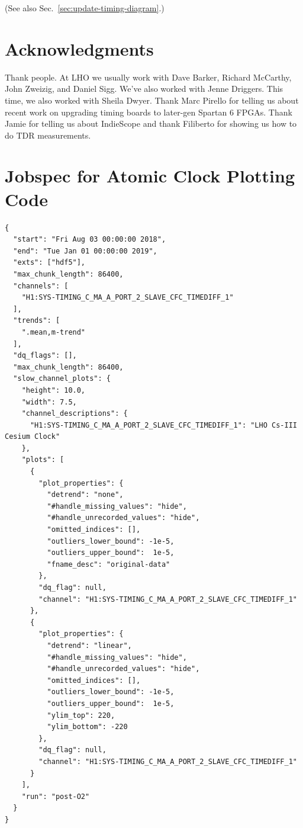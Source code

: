\documentclass{article}
\newcommand*{\TODO}{\textcolor{todo}}
\begin{document}
(See also Sec.~\ref{sec:update-timing-diagram}.)

\section{Acknowledgments}

\TODO{Thank people. At LHO we usually work with Dave Barker, Richard McCarthy, John Zweizig, and Daniel Sigg. We've also worked with Jenne Driggers. This time, we also worked with Sheila Dwyer. Thank Marc Pirello for telling us about recent work on upgrading timing boards to later-gen Spartan 6 FPGAs. Thank Jamie for telling us about IndieScope and thank Filiberto for showing us how to do TDR measurements. } 


\clearpage
\appendix
\section{Jobspec for Atomic Clock Plotting Code}
\label{sec:jobspec}
	\begin{lstlisting}
{
  "start": "Fri Aug 03 00:00:00 2018",
  "end": "Tue Jan 01 00:00:00 2019",
  "exts": ["hdf5"],
  "max_chunk_length": 86400,
  "channels": [
    "H1:SYS-TIMING_C_MA_A_PORT_2_SLAVE_CFC_TIMEDIFF_1"
  ],
  "trends": [
    ".mean,m-trend"
  ],
  "dq_flags": [],
  "max_chunk_length": 86400,
  "slow_channel_plots": {
    "height": 10.0,
    "width": 7.5,
    "channel_descriptions": {
      "H1:SYS-TIMING_C_MA_A_PORT_2_SLAVE_CFC_TIMEDIFF_1": "LHO Cs-III Cesium Clock"
    },
    "plots": [
      {
        "plot_properties": {
          "detrend": "none",
          "#handle_missing_values": "hide",
          "#handle_unrecorded_values": "hide",
          "omitted_indices": [],
          "outliers_lower_bound": -1e-5,
          "outliers_upper_bound":  1e-5,
          "fname_desc": "original-data"
        },
        "dq_flag": null,
        "channel": "H1:SYS-TIMING_C_MA_A_PORT_2_SLAVE_CFC_TIMEDIFF_1"
      },
      {
        "plot_properties": {
          "detrend": "linear",
          "#handle_missing_values": "hide",
          "#handle_unrecorded_values": "hide",
          "omitted_indices": [],
          "outliers_lower_bound": -1e-5,
          "outliers_upper_bound":  1e-5,
          "ylim_top": 220,
          "ylim_bottom": -220
        },
        "dq_flag": null,
        "channel": "H1:SYS-TIMING_C_MA_A_PORT_2_SLAVE_CFC_TIMEDIFF_1"
      }
    ],
    "run": "post-O2"
  }
}
\end{lstlisting}
\clearpage
\end{document}
